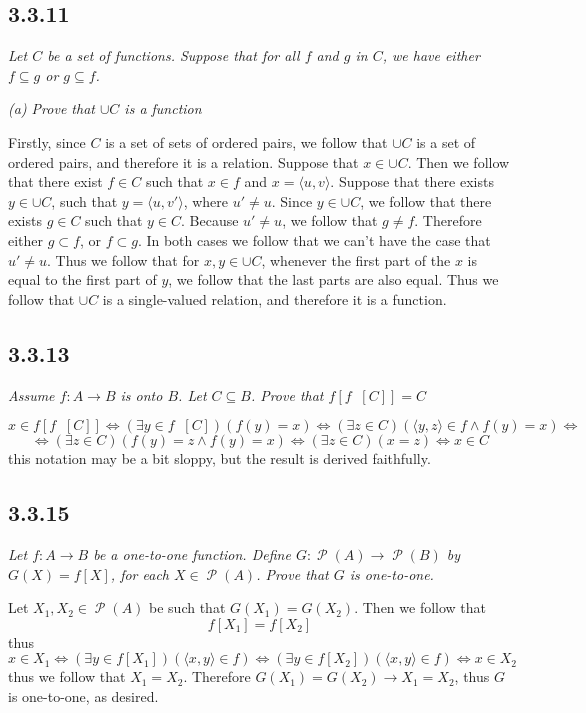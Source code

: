 \documentclass[11pt,oneside,titlepage]{book}
\DeclareMathOperator \pow {\mathcal {P}}
\DeclareMathOperator \inv {^{-1}}
\DeclareMathOperator \lra {\Leftrightarrow}
\newcommand{\eangle}[1]{\langle #1 \rangle}
\begin{document}
\subsection*{3.3.11}

\textit{Let $C$ be a set of functions. Suppose that for all $f$ and $g$ in $C$, we have either
  $f \subseteq g$ or $g \subseteq f$. }

\textit{(a) Prove that $\cup C$ is a function}

Firstly, since $C$ is a set of sets of ordered pairs, we follow that $\cup C$ is a set of
ordered pairs, and therefore it is a relation. Suppose that $x \in \cup C$. Then we follow that
there exist  $f \in C$ such that $x \in f$ and 
$x = \eangle{u, v}$. Suppose that there exists $y \in \cup C$, such that $y = \eangle{u, v'}$,
where $u' \neq u$. Since $y \in \cup C$, we follow that there exists $g \in C$ such that
$y \in C$. Because $u' \neq u$, we follow that $g \neq f$. Therefore either $g \subset f$,
or $f \subset g$. In both cases we follow that we can't have the case that $u' \neq u$. Thus
we follow that for $x, y \in \cup C$, whenever the first part of the $x$ is equal to the first
part of $y$, we follow that the last parts are also equal. Thus we follow that $\cup C$ is
a single-valued relation, and therefore it is a function.

\subsection*{3.3.13}

\textit{Assume $f: A \to B$ is onto $B$. Let $C \subseteq B$. Prove that $f[f\inv[C]] = C$}

$$x \in f[f\inv[C]] \lra (\exists y \in f\inv[C])(f(y) = x) \lra
(\exists z \in C)(\eangle{y, z} \in f \land f(y) = x) \lra$$
$$ \lra (\exists z \in C)(f(y) = z \land f(y) = x) \lra (\exists z \in C)(x = z) \lra x \in C$$
this notation may be a bit sloppy, but the result is derived faithfully.

\subsection*{3.3.15}

\textit{Let $f: A \to B$ be a one-to-one function. Define $G: \pow(A) \to \pow(B)$ by
  $G(X) = f[X]$, for each $X \in \pow(A)$. Prove that $G$ is one-to-one.}

Let $X_1, X_2 \in \pow(A)$ be such that $G(X_1) = G(X_2)$. Then we follow that
$$f[X_1] = f[X_2]$$
thus
$$x \in X_1 \lra (\exists y \in f[X_1])(\eangle{x, y} \in f) \lra
(\exists y \in f[X_2])(\eangle{x, y} \in f) \lra x \in X_2$$
thus we follow that $X_1 = X_2$. Therefore $G(X_1) = G(X_2) \to X_1 = X_2$, thus $G$ is
one-to-one, as desired.
\end{document}
